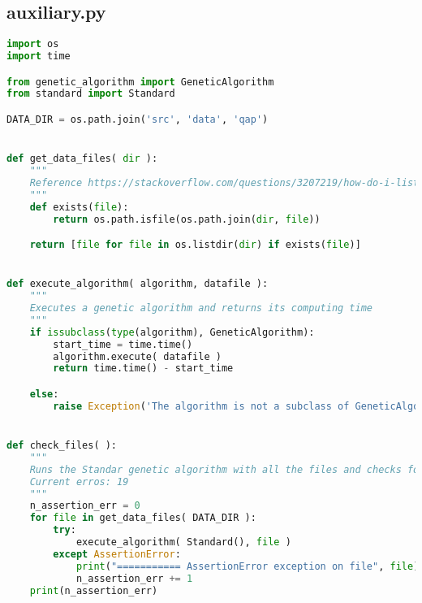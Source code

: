 \newpage

\subsection*{auxiliary.py}
\begin{lstlisting}[language=python]
import os
import time

from genetic_algorithm import GeneticAlgorithm
from standard import Standard

DATA_DIR = os.path.join('src', 'data', 'qap')


def get_data_files( dir ):
    """
    Reference https://stackoverflow.com/questions/3207219/how-do-i-list-all-files-of-a-directory
    """
    def exists(file):
        return os.path.isfile(os.path.join(dir, file))

    return [file for file in os.listdir(dir) if exists(file)]


def execute_algorithm( algorithm, datafile ):
    """
    Executes a genetic algorithm and returns its computing time
    """
    if issubclass(type(algorithm), GeneticAlgorithm):
        start_time = time.time()
        algorithm.execute( datafile )
        return time.time() - start_time

    else:
        raise Exception('The algorithm is not a subclass of GeneticAlgorithm')


def check_files( ):
    """
    Runs the Standar genetic algorithm with all the files and checks for AssertionErrors, that happens when the files are not well-structured Corret structure: Problem size, flow matrix and distance matrix with size equal to the problem size
    Current erros: 19
    """
    n_assertion_err = 0
    for file in get_data_files( DATA_DIR ):
        try:
            execute_algorithm( Standard(), file )
        except AssertionError:
            print("=========== AssertionError exception on file", file)
            n_assertion_err += 1
    print(n_assertion_err)

\end{lstlisting}

